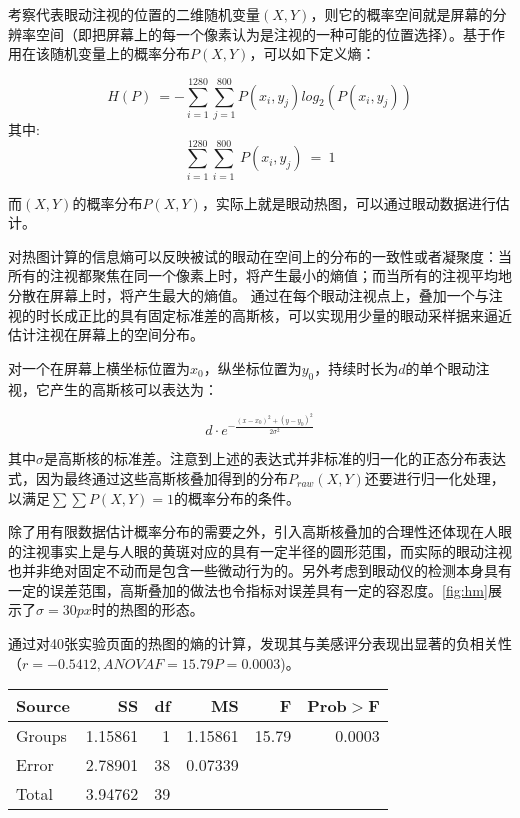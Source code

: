 考察代表眼动注视的位置的二维随机变量$(X, Y)$，则它的概率空间就是屏幕的分辨率空间（即把屏幕上的每一个像素认为是注视的一种可能的位置选择）。基于作用在该随机变量上的概率分布$P(X, Y)$，可以如下定义熵：

$$H(P)~=-\sum_{i=1}^{1280} \sum_{j=1}^{800} P(x_i, y_j)log_2(P(x_i, y_j))$$
其中: $$\sum_{i=1}^{1280}\sum_{i=1}^{800}~P(x_i, y_j)~=~1$$

而$(X, Y)$的概率分布$P(X, Y)$，实际上就是眼动热图，可以通过眼动数据进行估计。

对热图计算的信息熵可以反映被试的眼动在空间上的分布的一致性或者凝聚度：当所有的注视都聚焦在同一个像素上时，将产生最小的熵值；而当所有的注视平均地分散在屏幕上时，将产生最大的熵值。
通过在每个眼动注视点上，叠加一个与注视的时长成正比的具有固定标准差的高斯核，可以实现用少量的眼动采样据来逼近估计注视在屏幕上的空间分布。

对一个在屏幕上横坐标位置为$x_0$，纵坐标位置为$y_0$，持续时长为$d$的单个眼动注视，它产生的高斯核可以表达为：

$$d\cdot e^{-\frac{(x-x_0)^2 + (y-y_0)^2}{2\sigma^2}}$$

其中$\sigma$是高斯核的标准差。注意到上述的表达式并非标准的归一化的正态分布表达式，因为最终通过这些高斯核叠加得到的分布$P_{raw}(X, Y)$还要进行归一化处理，以满足$\sum\sum P(X, Y) = 1$的概率分布的条件。

除了用有限数据估计概率分布的需要之外，引入高斯核叠加的合理性还体现在人眼的注视事实上是与人眼的黄斑对应的具有一定半径的圆形范围，而实际的眼动注视也并非绝对固定不动而是包含一些微动行为的。另外考虑到眼动仪的检测本身具有一定的误差范围，高斯叠加的做法也令指标对误差具有一定的容忍度。\ref{fig:hm}展示了$\sigma=30px$时的热图的形态。

通过对40张实验页面的热图的熵的计算，发现其与美感评分表现出显著的负相关性（$r = -0.5412, ANOVA F = 15.79 P = 0.0003$)。

\begin{table}[H]
\centering
\begin{tabular}{lrrrrr}
  \hline
  Source&SS&df&MS&F&Prob$>$F\\ \hline
  Groups&1.15861&1&1.15861&15.79&0.0003\\
  Error&2.78901&38&0.07339&&\\
  Total&3.94762&39&&&\\
  \hline
\end{tabular}
\end{table}

